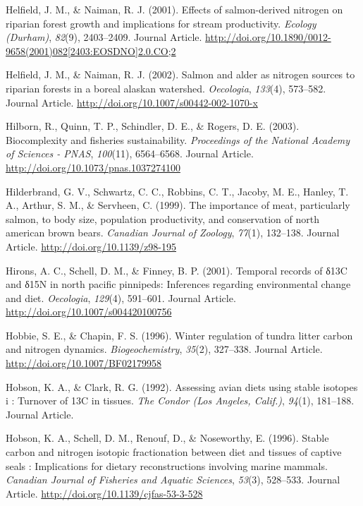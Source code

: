 \documentclass [11pt, proquest] {uwthesis}[2015/03/03]
\begin{document}
\hypertarget{ref-Helfield2001}{}
Helfield, J. M., \& Naiman, R. J. (2001). Effects of salmon-derived
nitrogen on riparian forest growth and implications for stream
productivity. \emph{Ecology (Durham)}, \emph{82}(9), 2403--2409. Journal
Article.
\href{http://doi.org/10.1890/0012-9658(2001)082\%5B2403:EOSDNO\%5D2.0.CO;2}{http://doi.org/10.1890/0012-9658(2001)082{[}2403:EOSDNO{]}2.0.CO;2}

\hypertarget{ref-Helfield2002}{}
Helfield, J. M., \& Naiman, R. J. (2002). Salmon and alder as nitrogen
sources to riparian forests in a boreal alaskan watershed.
\emph{Oecologia}, \emph{133}(4), 573--582. Journal Article.
\url{http://doi.org/10.1007/s00442-002-1070-x}

\hypertarget{ref-Hilborn2003}{}
Hilborn, R., Quinn, T. P., Schindler, D. E., \& Rogers, D. E. (2003).
Biocomplexity and fisheries sustainability. \emph{Proceedings of the
National Academy of Sciences - PNAS}, \emph{100}(11), 6564--6568.
Journal Article. \url{http://doi.org/10.1073/pnas.1037274100}

\hypertarget{ref-Hilderbrand1999}{}
Hilderbrand, G. V., Schwartz, C. C., Robbins, C. T., Jacoby, M. E.,
Hanley, T. A., Arthur, S. M., \& Servheen, C. (1999). The importance of
meat, particularly salmon, to body size, population productivity, and
conservation of north american brown bears. \emph{Canadian Journal of
Zoology}, \emph{77}(1), 132--138. Journal Article.
\url{http://doi.org/10.1139/z98-195}

\hypertarget{ref-Hirons2001}{}
Hirons, A. C., Schell, D. M., \& Finney, B. P. (2001). Temporal records
of δ13C and δ15N in north pacific pinnipeds: Inferences regarding
environmental change and diet. \emph{Oecologia}, \emph{129}(4),
591--601. Journal Article. \url{http://doi.org/10.1007/s004420100756}

\hypertarget{ref-Hobbie1996}{}
Hobbie, S. E., \& Chapin, F. S. (1996). Winter regulation of tundra
litter carbon and nitrogen dynamics. \emph{Biogeochemistry},
\emph{35}(2), 327--338. Journal Article.
\url{http://doi.org/10.1007/BF02179958}

\hypertarget{ref-Hobson1992}{}
Hobson, K. A., \& Clark, R. G. (1992). Assessing avian diets using
stable isotopes i : Turnover of 13C in tissues. \emph{The Condor (Los
Angeles, Calif.)}, \emph{94}(1), 181--188. Journal Article.

\hypertarget{ref-Hobson1996}{}
Hobson, K. A., Schell, D. M., Renouf, D., \& Noseworthy, E. (1996).
Stable carbon and nitrogen isotopic fractionation between diet and
tissues of captive seals : Implications for dietary reconstructions
involving marine mammals. \emph{Canadian Journal of Fisheries and
Aquatic Sciences}, \emph{53}(3), 528--533. Journal Article.
\url{http://doi.org/10.1139/cjfas-53-3-528}
\end{document}
